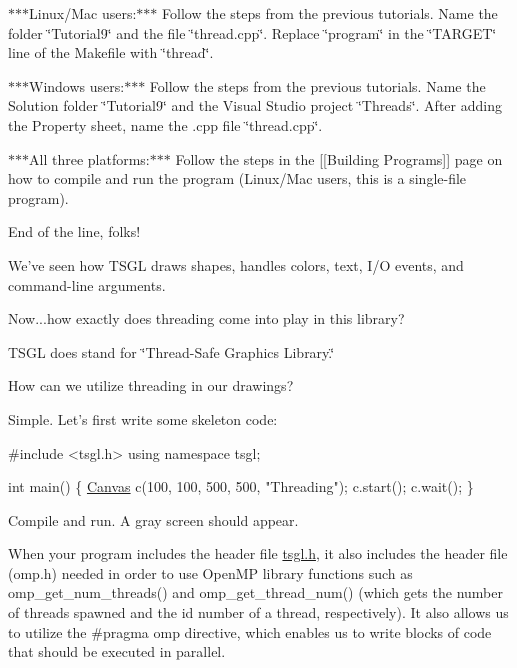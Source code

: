 $\ast$$\ast$$\ast$\-Linux/\-Mac users\-:$\ast$$\ast$$\ast$ Follow the steps from the previous tutorials. Name the folder \char`\"{}\-Tutorial9\char`\"{} and the file \char`\"{}thread.\-cpp\char`\"{}. Replace \char`\"{}program\char`\"{} in the \char`\"{}\-T\-A\-R\-G\-E\-T\char`\"{} line of the Makefile with \char`\"{}thread\char`\"{}.

$\ast$$\ast$$\ast$\-Windows users\-:$\ast$$\ast$$\ast$ Follow the steps from the previous tutorials. Name the Solution folder \char`\"{}\-Tutorial9\char`\"{} and the Visual Studio project \char`\"{}\-Threads\char`\"{}. After adding the Property sheet, name the .cpp file \char`\"{}thread.\-cpp\char`\"{}.

$\ast$$\ast$$\ast$\-All three platforms\-:$\ast$$\ast$$\ast$ Follow the steps in the \mbox{[}\mbox{[}Building Programs\mbox{]}\mbox{]} page on how to compile and run the program (Linux/\-Mac users, this is a single-\/file program).

End of the line, folks!

We've seen how T\-S\-G\-L draws shapes, handles colors, text, I/\-O events, and command-\/line arguments.

Now...how exactly does threading come into play in this library?

T\-S\-G\-L does stand for \char`\"{}\-Thread-\/\-Safe Graphics Library.\char`\"{}

How can we utilize threading in our drawings?

Simple. Let's first write some skeleton code\-:


\begin{DoxyCode}
\textcolor{preprocessor}{#include <tsgl.h>}
\textcolor{keyword}{using namespace }tsgl;

\textcolor{keywordtype}{int} main() \{
  \hyperlink{classtsgl_1_1_canvas}{Canvas} c(100, 100, 500, 500, \textcolor{stringliteral}{"Threading"});
  c.start();
  c.wait();
\}
\end{DoxyCode}


Compile and run. A gray screen should appear.

When your program includes the header file {\ttfamily \hyperlink{tsgl_8h_source}{tsgl.\-h}}, it also includes the header file ({\ttfamily omp.\-h}) needed in order to use Open\-M\-P library functions such as {\ttfamily omp\-\_\-get\-\_\-num\-\_\-threads()} and {\ttfamily omp\-\_\-get\-\_\-thread\-\_\-num()} (which gets the number of threads spawned and the id number of a thread, respectively). It also allows us to utilize the {\ttfamily \#pragma omp} directive, which enables us to write blocks of code that should be executed in parallel.

